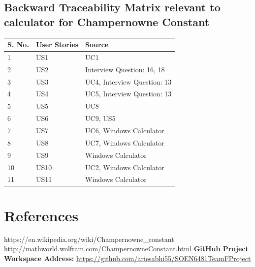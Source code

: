 \documentclass[paper=a4, fontsize=11pt]{report}
\numberwithin{equation}{section}		%
\numberwithin{figure}{section}			%
\numberwithin{table}{section}				%
\begin{document}
  
\section{Backward Traceability Matrix relevant to calculator for Champernowne Constant }

\begin{center}
\begin{tabular}{| m{1cm} | m{1.2cm} | m{25em} |} 
\hline
S. No. & User Stories & Source \\ [0.7ex]
\hline\hline
1 & US1 & UC1 \\ 
\hline
2 & US2 & Interview Question: 16, 18  \\ 
\hline
3 & US3 & UC4, Interview Question: 13 \\ 
\hline
4 & US4 & UC5, Interview Question: 13  \\ 
\hline
5 & US5 & UC8 \\ 
\hline
6 & US6 & UC9, US5 \\ 
\hline
7 & US7 & UC6, Windows Calculator \\ 
\hline
8 & US8 & UC7, Windows Calculator \\ 
\hline
9 & US9 & Windows Calculator \\ 
\hline
10 & US10 & UC2, Windows Calculator \\ 
\hline
11 & US11 & Windows Calculator \\ 
\hline
\end{tabular}
\end{center}



\printglossary

\chapter{References}

https://en.wikipedia.org/wiki/Champernowne\_constant
\vskip1mm
http://mathworld.wolfram.com/ChampernowneConstant.html
\vskip1mm
\textbf{GitHub Project Workspace Address:} \url{https://github.com/ariesabhi55/SOEN6481TeamFProject} 
\end{document}
